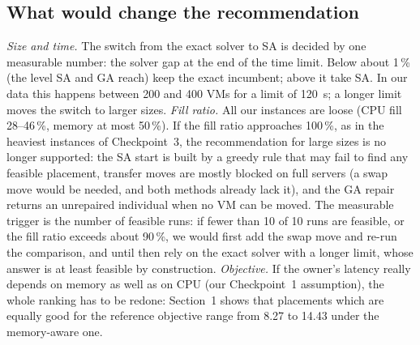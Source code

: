 \documentclass[11pt,a4paper]{article}
\begin{document}
\subsection*{What would change the recommendation}
\emph{Size and time.} The switch from the exact solver to SA is decided by one measurable number: the solver gap at the end of the time limit. Below about 1\,\% (the level SA and GA reach) keep the exact incumbent; above it take SA. In our data this happens between 200 and 400 VMs for a limit of 120~s; a longer limit moves the switch to larger sizes.
\emph{Fill ratio.} All our instances are loose (CPU fill 28--46\,\%, memory at most 50\,\%). If the fill ratio approaches 100\,\%, as in the heaviest instances of Checkpoint~3, the recommendation for large sizes is no longer supported: the SA start is built by a greedy rule that may fail to find any feasible placement, transfer moves are mostly blocked on full servers (a swap move would be needed, and both methods already lack it), and the GA repair returns an unrepaired individual when no VM can be moved. The measurable trigger is the number of feasible runs: if fewer than 10 of 10 runs are feasible, or the fill ratio exceeds about 90\,\%, we would first add the swap move and re-run the comparison, and until then rely on the exact solver with a longer limit, whose answer is at least feasible by construction.
\emph{Objective.} If the owner's latency really depends on memory as well as on CPU (our Checkpoint~1 assumption), the whole ranking has to be redone: Section~1 shows that placements which are equally good for the reference objective range from 8.27 to 14.43 under the memory-aware one.

\appendix
\end{document}

